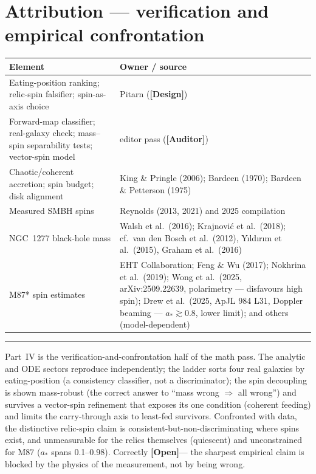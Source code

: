 \documentclass[11pt]{article}
\newcommand{\Design}{\textbf{\textcolor{purple!65!black}{[Design]}}}
\newcommand{\Open}{\textbf{\textcolor{gray!10!black}{[Open]}}}
\newcommand{\Auditor}{\textbf{\textcolor{teal!55!black}{[Auditor]}}}
\begin{document}
\section{Attribution --- verification and empirical confrontation}
\begin{center}\small
\begin{tabular}{@{}p{}p{}@{}}
\toprule
Element & Owner / source \\
\midrule
Eating-position ranking; relic-spin falsifier; spin-as-axis choice & Pitarn (\Design) \\
Forward-map classifier; real-galaxy check; mass--spin separability tests; vector-spin model & editor pass (\Auditor) \\
Chaotic/coherent accretion; spin budget; disk alignment & King \& Pringle (2006); Bardeen (1970); Bardeen \& Petterson (1975) \\
Measured SMBH spins & Reynolds (2013, 2021) and 2025 compilation \\
NGC~1277 black-hole mass & Walsh et al.\ (2016); Krajnovi\'c et al.\ (2018); cf.\ van den Bosch et al.\ (2012), Y\i ld\i r\i m et al.\ (2015), Graham et al.\ (2016) \\
M87* spin estimates & EHT Collaboration; Feng \& Wu (2017); Nokhrina et al.\ (2019); Wong et al.\ (2025, arXiv:2509.22639, polarimetry --- disfavours high spin); Drew et al.\ (2025, ApJL 984 L31, Doppler beaming --- $a_*\gtrsim0.8$, lower limit); and others (model-dependent) \\
\bottomrule
\end{tabular}
\end{center}

\vspace{4pt}\hrule\vspace{4pt}
{\small Part~IV is the verification-and-confrontation half of the math pass. The analytic and ODE sectors reproduce independently; the ladder sorts four real galaxies by eating-position (a consistency classifier, not a discriminator); the spin decoupling is shown mass-robust (the correct answer to ``mass wrong $\Rightarrow$ all wrong'') and survives a vector-spin refinement that exposes its one condition (coherent feeding) and limits the carry-through axis to least-fed survivors. Confronted with data, the distinctive relic-spin claim is consistent-but-non-discriminating where spins exist, and unmeasurable for the relics themselves (quiescent) and unconstrained for M87 ($a_\ast$ spans 0.1--0.98). Correctly \Open --- the sharpest empirical claim is blocked by the physics of the measurement, not by being wrong.}
\end{document}
